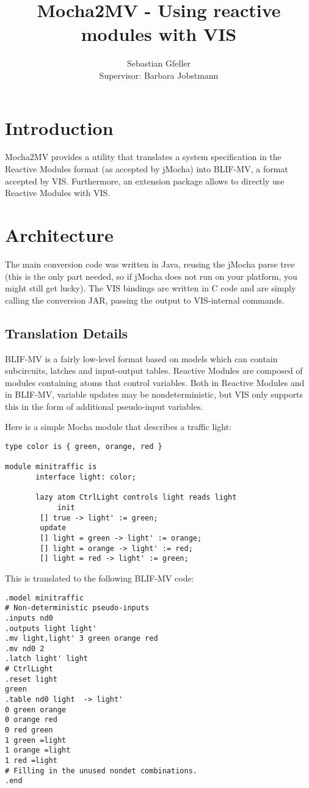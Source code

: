 \documentclass[a4paper,12pt]{article}
\title{Mocha2MV - Using reactive modules with VIS}
\author{Sebastian Gfeller\\
Supervisor: Barbara Jobstmann}
\begin{document}
\maketitle

\section{Introduction}
Mocha2MV provides a utility that translates a system
specification in the Reactive Modules format (as accepted by jMocha) into
BLIF-MV, a format accepted by VIS. Furthermore, an extension package allows to
directly use Reactive Modules with VIS.

\section{Architecture}
The main conversion code was written in Java, reusing the jMocha parse
tree (this is the only part needed, so if jMocha does not run on your
platform, you might still get lucky). The VIS bindings are written in
C code and are simply calling the conversion JAR, passing the output
to VIS-internal commands.

\subsection{Translation Details}
BLIF-MV is a fairly low-level format based on models which can contain
subcircuits, latches and input-output tables. Reactive Modules are
composed of modules containing atoms that control variables. Both in
Reactive Modules and in BLIF-MV, variable updates may be nondeterministic,
but VIS only supports this in the form of additional pseudo-input variables.

Here is a simple Mocha module that describes a traffic light:

\begin{verbatim}
type color is { green, orange, red }

module minitraffic is
       interface light: color;

       lazy atom CtrlLight controls light reads light
       	    init
		[] true -> light' := green;
	    update
		[] light = green -> light' := orange;
		[] light = orange -> light' := red;
		[] light = red -> light' := green;
\end{verbatim}

This is translated to the following BLIF-MV code:

\begin{verbatim}
.model minitraffic
# Non-deterministic pseudo-inputs
.inputs nd0 
.outputs light light'
.mv light,light' 3 green orange red
.mv nd0 2
.latch light' light
# CtrlLight
.reset light
green 
.table nd0 light  -> light' 
0 green orange 
0 orange red 
0 red green 
1 green =light 
1 orange =light 
1 red =light 
# Filling in the unused nondet combinations.
.end
\end{verbatim}
\end{document}
